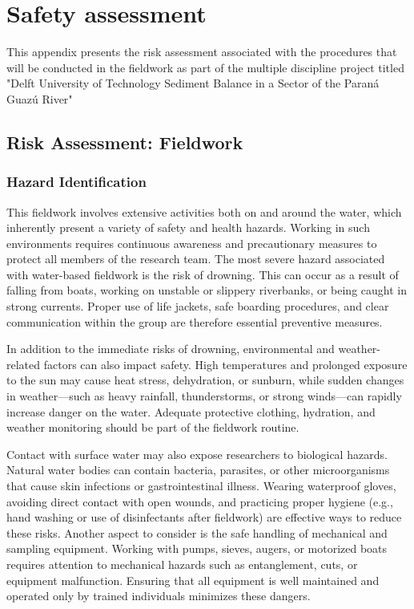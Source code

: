 
\chapter{Safety assessment}

This appendix presents the risk assessment associated with the procedures that will be conducted in the fieldwork as part of the multiple discipline project titled "Delft University of Technology Sediment Balance in a Sector of the Paraná Guazú River"

\section{Risk Assessment: Fieldwork}

\subsection{Hazard Identification}
This fieldwork involves extensive activities both on and around the water, which inherently present a variety of safety and health hazards. Working in such environments requires continuous awareness and precautionary measures to protect all members of the research team.
The most severe hazard associated with water-based fieldwork is the risk of drowning. This can occur as a result of falling from boats, working on unstable or slippery riverbanks, or being caught in strong currents. Proper use of life jackets, safe boarding procedures, and clear communication within the group are therefore essential preventive measures.

In addition to the immediate risks of drowning, environmental and weather-related factors can also impact safety. High temperatures and prolonged exposure to the sun may cause heat stress, dehydration, or sunburn, while sudden changes in weather—such as heavy rainfall, thunderstorms, or strong winds—can rapidly increase danger on the water. Adequate protective clothing, hydration, and weather monitoring should be part of the fieldwork routine.

Contact with surface water may also expose researchers to biological hazards. Natural water bodies can contain bacteria, parasites, or other microorganisms that cause skin infections or gastrointestinal illness. Wearing waterproof gloves, avoiding direct contact with open wounds, and practicing proper hygiene (e.g., hand washing or use of disinfectants after fieldwork) are effective ways to reduce these risks.
Another aspect to consider is the safe handling of mechanical and sampling equipment. Working with pumps, sieves, augers, or motorized boats requires attention to mechanical hazards such as entanglement, cuts, or equipment malfunction. Ensuring that all equipment is well maintained and operated only by trained individuals minimizes these dangers.

